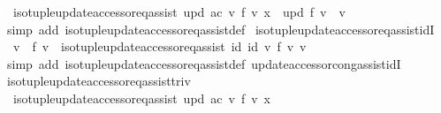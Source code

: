 \begin{isabellebody}
\ \ {\isachardoublequoteopen}iso{\isacharunderscore}{\kern0pt}tuple{\isacharunderscore}{\kern0pt}update{\isacharunderscore}{\kern0pt}accessor{\isacharunderscore}{\kern0pt}eq{\isacharunderscore}{\kern0pt}assist\ upd\ ac\ v\ f\ v{\isacharprime}{\kern0pt}\ x\ {\isasymLongrightarrow}\ upd\ f\ v\ {\isacharequal}{\kern0pt}\ v{\isacharprime}{\kern0pt}{\isachardoublequoteclose}\isanewline
%
\isadelimproof
\ \ %
\endisadelimproof
%
\isatagproof
{}\isamarkupfalse%
\ {\isacharparenleft}{\kern0pt}simp\ add{\isacharcolon}{\kern0pt}\ iso{\isacharunderscore}{\kern0pt}tuple{\isacharunderscore}{\kern0pt}update{\isacharunderscore}{\kern0pt}accessor{\isacharunderscore}{\kern0pt}eq{\isacharunderscore}{\kern0pt}assist{\isacharunderscore}{\kern0pt}def{\isacharparenright}{\kern0pt}%
\endisatagproof
{\isafoldproof}%
%
\isadelimproof
\isanewline
%
\endisadelimproof
\isanewline
{}\isamarkupfalse%
\ iso{\isacharunderscore}{\kern0pt}tuple{\isacharunderscore}{\kern0pt}update{\isacharunderscore}{\kern0pt}accessor{\isacharunderscore}{\kern0pt}eq{\isacharunderscore}{\kern0pt}assist{\isacharunderscore}{\kern0pt}idI{\isacharcolon}{\kern0pt}\isanewline
\ \ {\isachardoublequoteopen}v{\isacharprime}{\kern0pt}\ {\isacharequal}{\kern0pt}\ f\ v\ {\isasymLongrightarrow}\ iso{\isacharunderscore}{\kern0pt}tuple{\isacharunderscore}{\kern0pt}update{\isacharunderscore}{\kern0pt}accessor{\isacharunderscore}{\kern0pt}eq{\isacharunderscore}{\kern0pt}assist\ id\ id\ v\ f\ v{\isacharprime}{\kern0pt}\ v{\isachardoublequoteclose}\isanewline
%
\isadelimproof
\ \ %
\endisadelimproof
%
\isatagproof
{}\isamarkupfalse%
\ {\isacharparenleft}{\kern0pt}simp\ add{\isacharcolon}{\kern0pt}\ iso{\isacharunderscore}{\kern0pt}tuple{\isacharunderscore}{\kern0pt}update{\isacharunderscore}{\kern0pt}accessor{\isacharunderscore}{\kern0pt}eq{\isacharunderscore}{\kern0pt}assist{\isacharunderscore}{\kern0pt}def\ update{\isacharunderscore}{\kern0pt}accessor{\isacharunderscore}{\kern0pt}cong{\isacharunderscore}{\kern0pt}assist{\isacharunderscore}{\kern0pt}idI{\isacharparenright}{\kern0pt}%
\endisatagproof
{\isafoldproof}%
%
\isadelimproof
\isanewline
%
\endisadelimproof
\isanewline
{}\isamarkupfalse%
\ iso{\isacharunderscore}{\kern0pt}tuple{\isacharunderscore}{\kern0pt}update{\isacharunderscore}{\kern0pt}accessor{\isacharunderscore}{\kern0pt}eq{\isacharunderscore}{\kern0pt}assist{\isacharunderscore}{\kern0pt}triv{\isacharcolon}{\kern0pt}\isanewline
\ \ {\isachardoublequoteopen}iso{\isacharunderscore}{\kern0pt}tuple{\isacharunderscore}{\kern0pt}update{\isacharunderscore}{\kern0pt}accessor{\isacharunderscore}{\kern0pt}eq{\isacharunderscore}{\kern0pt}assist\ upd\ ac\ v\ f\ v{\isacharprime}{\kern0pt}\ x\ {\isasymLongrightarrow}\isanewline

\end{isabellebody}
